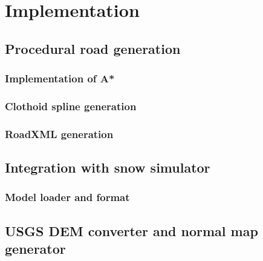 \chapter{Implementation}

\section{Procedural road generation}

\subsection{Implementation of A*}

\subsection{Clothoid spline generation}

\subsection{RoadXML generation}


\section{Integration with snow simulator}

\subsection{Model loader and format}


\section{USGS DEM converter and normal map generator}

